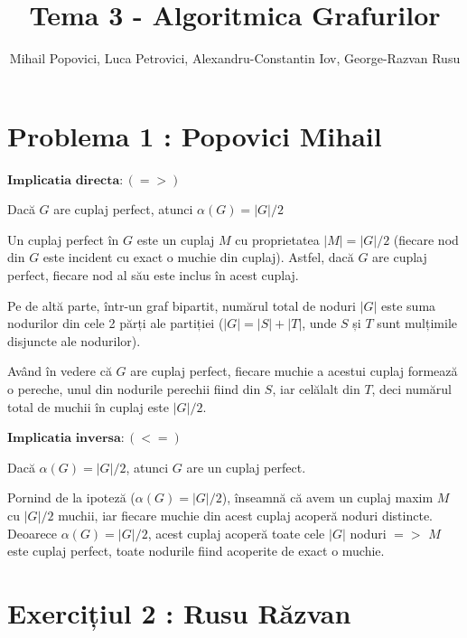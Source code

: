 \documentclass{article}
\title{Tema 3 - Algoritmica Grafurilor}
\author{Mihail Popovici, Luca Petrovici, Alexandru-Constantin Iov, George-Razvan Rusu}
\begin{document}
\maketitle

\section*{\fontsize{20}{50}\selectfont Problema 1 : Popovici Mihail}

{\fontsize{14}{16}\selectfont 
$\mathbf{Implicatia}$ $\mathbf{directa: (=>)}$ 
\par Dacă $G$ are cuplaj perfect, atunci $\alpha(G) = |G|/2$
\\
\par Un cuplaj perfect în $G$ este un cuplaj $M$ cu proprietatea $|M| = |G|/2$ (fiecare nod din $G$ este incident cu exact o muchie din cuplaj). Astfel, dacă $G$ are cuplaj perfect, fiecare nod al său este inclus în acest cuplaj. 
\par Pe de altă parte, într-un graf bipartit, numărul total de noduri $|G|$ este suma nodurilor din cele 2 părți ale partiției ($|G| = |S| + |T|$, unde $S$ și $T$ sunt mulțimile disjuncte ale nodurilor).
\par Având în vedere că $G$ are cuplaj perfect, fiecare muchie a acestui cuplaj formează o pereche, unul din nodurile perechii fiind din $S$, iar celălalt din $T$, deci numărul total de muchii în cuplaj este $|G|/2$.

\bigskip
$\mathbf{Implicatia}$ $\mathbf{inversa: (<=)}$ 
\par Dacă $\alpha(G) = |G|/2$, atunci $G$ are un cuplaj perfect.
\\

\par Pornind de la ipoteză ($\alpha(G) = |G|/2$), înseamnă că avem un cuplaj maxim $M$ cu $|G|/2$ muchii, iar fiecare muchie din acest cuplaj acoperă noduri distincte. Deoarece $\alpha(G) = |G|/2$, acest cuplaj acoperă toate cele $|G|$ noduri $=>$ $M$ este cuplaj perfect, toate nodurile fiind acoperite de exact o muchie. 

}

\section*{Exercițiul 2 : Rusu Răzvan}
\end{document}
